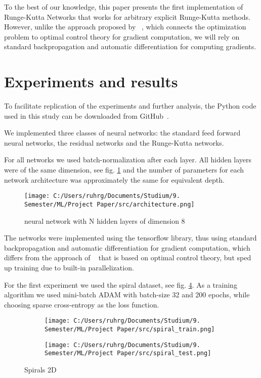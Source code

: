 \documentclass{article}
\begin{document}
To the best of our knowledge, this paper presents the first implementation of Runge-Kutta Networks that works for arbitrary explicit Runge-Kutta methods. However, unlike the approach proposed by ~\citep{benning2019}, which connects the optimization problem to optimal control theory for gradient computation, we will rely on standard backpropagation and automatic differentiation for computing gradients.

\section{Experiments and results}
To facilitate replication of the experiments and further analysis, the Python code used in this study can be downloaded from GitHub~\citep{tom2024}.

We implemented three classes of neural networks: the standard feed forward neural networks, the residual networks and the Runge-Kutta networks. 

For all networks we used batch-normalization after each layer. All hidden layers were of the same dimension, see fig. \ref{fig1} and the number of parameters for each network architecture was approximately the same for equivalent depth.

\begin{figure}[h!]
    \centering
    \texttt{[image: C:/Users/ruhrg/Documents/Studium/9. Semester/ML/Project Paper/src/architecture.png]}
    \caption{neural network with N hidden layers of dimension 8}
    \label{fig1}
\end{figure}

The networks were implemented using the tensorflow library, thus using standard backpropagation and automatic differentiation for gradient computation, which differs from the approach of ~\citep{benning2019} that is based on optimal control theory, but sped up training due to built-in parallelization. 

For the first experiment we used the spiral dataset, see fig. \ref{fig2}. As a training algorithm we used mini-batch ADAM with batch-size 32 and 200 epochs, while choosing sparse cross-entropy as the loss function.

\begin{figure}[h!]
    \centering
    \begin{subfigure}[b]{0.45\textwidth}
        \centering
        \texttt{[image: C:/Users/ruhrg/Documents/Studium/9. Semester/ML/Project Paper/src/spiral\_train.png]}
        \label{fig2-1}
    \end{subfigure}
    \hfill
    \begin{subfigure}[b]{0.45\textwidth}
        \centering
        \texttt{[image: C:/Users/ruhrg/Documents/Studium/9. Semester/ML/Project Paper/src/spiral\_test.png]}
        \label{fig2-2}
    \end{subfigure}
    \caption{Spirals 2D}
    \label{fig2}
\end{figure}
\end{document}
